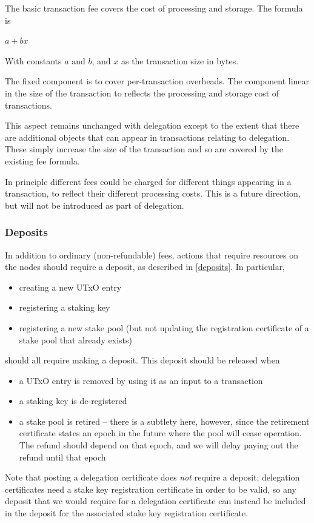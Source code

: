 \documentclass[11pt,a4paper]{article}
\begin{document}
The basic transaction fee covers the cost of processing and storage. The
formula is

\(a + b x\)

With constants \(a\) and \(b\), and \(x\) as the transaction size in
bytes.

The fixed component is to cover per-transaction overheads. The component
linear in the size of the transaction to reflects the processing and
storage cost of transactions.

This aspect remains unchanged with delegation except to the extent that
there are additional objects that can appear in transactions relating to
delegation. These simply increase the size of the transaction and so are
covered by the existing fee formula.

In principle different fees could be charged for different things
appearing in a transaction, to reflect their different processing costs.
This is a future direction, but will not be introduced as part of
delegation.

\subsubsection{Deposits}
\label{fees-deposits}

In addition to ordinary (non-refundable) fees, actions that require
resources on the nodes should require a deposit, as described in
\cref{deposits}. In particular,
\begin{itemize}
\item creating a new UTxO entry
\item registering a staking key
\item registering a new stake pool (but not updating the registration
  certificate of a stake pool that already exists)
\end{itemize}
should all require making a deposit. This deposit should be released
when
\begin{itemize}
\item a UTxO entry is removed by using it as an input to a transaction
\item a staking key is de-registered
\item a stake pool is retired -- there is a subtlety here, however,
  since the retirement certificate states an epoch in the future where
  the pool will cease operation. The refund should depend on that
  epoch, and we will delay paying out the refund until that epoch
\end{itemize}
Note that posting a delegation certificate does \emph{not} require a
deposit; delegation certificates need a stake key registration
certificate in order to be valid, so any deposit that we would require
for a delegation certificate can instead be included in the deposit
for the associated stake key registration certificate.
\end{document}
